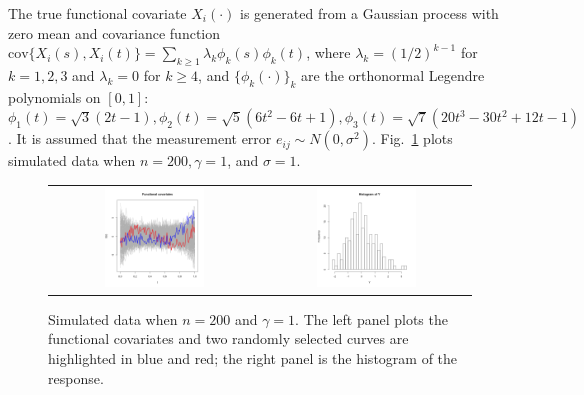 \documentclass[times,sort&compress,3p]{elsarticle}
\theoremstyle{plain}%
\theoremstyle{definition}
\begin{document}
The true functional covariate $X_i(\cdot)$ is generated from a Gaussian process with zero mean and covariance function $\textrm{cov}\{X_i(s), X_i(t)\} = \sum_{k\geq 1} \lambda_k \phi_k(s) \phi_k(t)$, where $\lambda_k = (1/2)^{k - 1}$ for $k = 1, 2, 3$ and $\lambda_k = 0$ for $k \geq 4$, and $\{\phi_k(\cdot)\}_k$ are the orthonormal Legendre polynomials on $[0,1]$: $\phi_1(t) = \sqrt{3}(2t - 1), \phi_2(t) = \sqrt{5}(6t^2 - 6t + 1), \phi_3(t) = \sqrt{7}(20t^3 - 30t^2 + 12t - 1)$. It is assumed that the measurement error $e_{ij}\sim N(0, \sigma^2)$. Fig.~\ref{fig:sim.data} plots simulated data when $n = 200, \gamma = 1$, and $\sigma = 1$. %
\begin{figure}
	\centering 
	\begin{tabular}{cc}
		\includegraphics[width = 0.5\textwidth]{sim_x.png} & 
		\includegraphics[width = 0.5\textwidth]{sim_Y.png} 
		\end{tabular} 
		\caption{Simulated data when $n = 200$ and $\gamma = 1$. The left panel plots the functional covariates and two randomly selected curves are highlighted in blue and red; the right panel is the histogram of the response. }
		\label{fig:sim.data} 
\end{figure}
\end{document}
